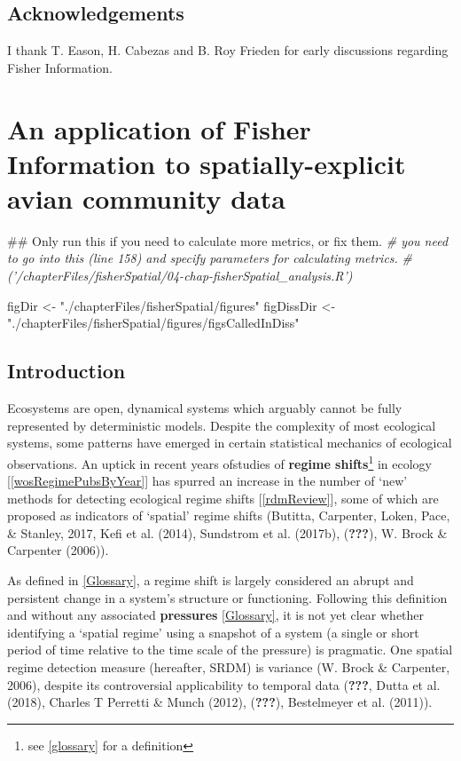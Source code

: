 \documentclass[12pt,twoside,openany]{reedthesis}
\newenvironment{Shaded}{\begin{snugshade}}{\end{snugshade}}
\newcommand{\StringTok}[1]{\textcolor[rgb]{0.31,0.60,0.02}{#1}}
\newcommand{\CommentTok}[1]{\textcolor[rgb]{0.56,0.35,0.01}{\textit{#1}}}
\newcommand{\NormalTok}[1]{#1}
\begin{document}
\section{Acknowledgements}\label{acknowledgements}

I thank T. Eason, H. Cabezas and B. Roy Frieden for early discussions
regarding Fisher Information.

\chapter{An application of Fisher Information to spatially-explicit
avian community data}\label{fisherSpatial}
\begin{Shaded}
\begin{Highlighting}[]
\NormalTok{## Only run this if you need to calculate more metrics, or fix them.}
\CommentTok{# you need to go into this (line 158) and specify parameters for calculating metrics.}
\CommentTok{# ('/chapterFiles/fisherSpatial/04-chap-fisherSpatial_analysis.R')}
\end{Highlighting}
\end{Shaded}
\begin{Shaded}
\begin{Highlighting}[]
\NormalTok{figDir <-}\StringTok{ "./chapterFiles/fisherSpatial/figures"}
\NormalTok{figDissDir <-}\StringTok{ "./chapterFiles/fisherSpatial/figures/figsCalledInDiss"}
\end{Highlighting}
\end{Shaded}
\section{Introduction}\label{introduction-2}

Ecosystems are open, dynamical systems which arguably cannot be fully
represented by deterministic models. Despite the complexity of most
ecological systems, some patterns have emerged in certain statistical
mechanics of ecological observations. An uptick in recent years
ofstudies of \textbf{regime shifts}\footnote{see \ref{glossary} for a
  definition} in ecology {[}\ref{wosRegimePubsByYear}{]} has spurred an
increase in the number of `new' methods for detecting ecological regime
shifts {[}\ref{rdmReview}{]}, some of which are proposed as indicators
of `spatial' regime shifts (Butitta, Carpenter, Loken, Pace, \& Stanley,
2017, Kefi et al. (2014), Sundstrom et al. (2017b), ({\textbf{???}}), W.
Brock \& Carpenter (2006)).

As defined in \ref{Glossary}, a regime shift is largely considered an
abrupt and persistent change in a system's structure or functioning.
Following this definition and without any associated \textbf{pressures}
\ref{Glossary}, it is not yet clear whether identifying a `spatial
regime' using a snapshot of a system (a single or short period of time
relative to the time scale of the pressure) is pragmatic. One spatial
regime detection measure (hereafter, SRDM) is variance (W. Brock \&
Carpenter, 2006), despite its controversial applicability to temporal
data ({\textbf{???}}, Dutta et al. (2018), Charles T Perretti \& Munch
(2012), ({\textbf{???}}), Bestelmeyer et al. (2011)).
\end{document}
